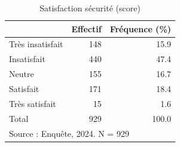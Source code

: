 \begin{table}[htbp]\centering
\def\sym#1{\ifmmode^{#1}\else\(^{#1}\)\fi}
\caption{Satisfaction sécurité (score)}
\begin{tabular}{l*{2}{r}}
\toprule
            &    Effectif&Fréquence (\%)\\
\midrule
Très insatisfait&         148&        15.9\\
Insatisfait &         440&        47.4\\
Neutre      &         155&        16.7\\
Satisfait   &         171&        18.4\\
Très satisfait&          15&         1.6\\
Total       &         929&       100.0\\
\bottomrule
\multicolumn{3}{l}{\footnotesize Source : Enquête, 2024. N = 929}\\
\end{tabular}
\end{table}
